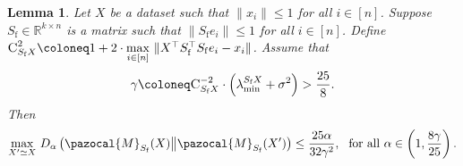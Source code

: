 \documentclass[11pt]{article}
\newtheorem{lem}{Lemma}
\theoremstyle{definition}
\theoremstyle{plain}
\newcommand{\reals}{\mathbb{R}}
\providecommand{\brI}{\mathbb{I}}
\newcommand{\Norm}[1]{\left\| #1 \right\|}
\providecommand{\norm}[1]{\Norm{#1}}
\providecommand{\KLDA}[2]{{D_{\alpha} \left( #1 \middle\| #2 \right)}}
\newcommand{\pM}{\pazocal{M}}
\begin{document}
\begin{lem} 
    \label{lem:privacy_lemma}
    Let \(X\) be a dataset such that \(\|x_{i}\| \leq 1\) for all \(i \in [n]\).
    Suppose \(S_{\mathrm{f}} \in \reals^{k \times n}\) is a matrix such that \(\|S_{\mathrm{f}}e_{i}\| \leq 1\) for all \(i \in [n]\).
    Define \(\textsc{C}_{S_{\mathrm{f}}X}^{2} \coloneq 1 + 2 \cdot \underset{i \in [n]}{\max}\  \|X^{\top}S_{\mathrm{f}}^{\top}S_{\mathrm{f}}e_i - x_i\|\). %
    Assume that 
    \begin{equation}
        \label{eq:gamma_lower_bound_fast}
        \gamma \coloneq \textsc{C}^{-2}_{S_{\mathrm{f}}X}\cdot \left(\lambda^{S_{\mathrm{f}}X}_{\min} + \sigma^2\right) > \frac{25}{8}.
    \end{equation}
    Then 
    \begin{equation}
        \label{eq:divergence_upperbound_basic}
        \underset{X'\simeq X}{\max} \ \KLDA{\pM_{S_{\mathrm{f}}}(X)}{\pM_{S_{\mathrm{f}}}(X')} \leq \frac{25\alpha}{32\gamma^2}, \ \ \mathrm{for \ all} \ \alpha \in \left(1, \frac{8\gamma}{25}\right).
    \end{equation}

\end{lem}
\end{document}
